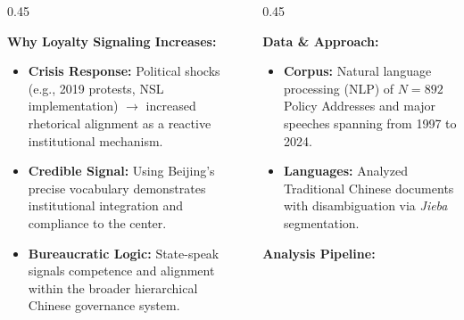 \documentclass[final,table]{beamer} %
\begin{document}
\begin{frame}[t]
\begin{columns}[T]
\begin{column}{0.45\textwidth}
        \vspace{2cm}

        \begin{tcolorbox}[posterbox={5}{Discussion}]
            \textbf{Why Loyalty Signaling Increases:}
            
            \vspace{1cm}
            \begin{itemize}
                \item \textbf{Crisis Response:} Political shocks (e.g., 2019 protests, NSL implementation) $\rightarrow$ increased rhetorical alignment as a reactive institutional mechanism.
                \item \textbf{Credible Signal:} Using Beijing's precise vocabulary demonstrates institutional integration and compliance to the center.
                \item \textbf{Bureaucratic Logic:} State-speak signals competence and alignment within the broader hierarchical Chinese governance system.
            \end{itemize}
        \end{tcolorbox}

    \end{column}

    \begin{column}{0.45\textwidth}

        \begin{tcolorbox}[posterbox={2}{Methods}]
            \textbf{Data \& Approach:}
            \vspace{0.5cm}
            \begin{itemize}
                \item \textbf{Corpus:} Natural language processing (NLP) of $N=892$ Policy Addresses and major speeches spanning from 1997 to 2024.
                \item \textbf{Languages:} Analyzed Traditional Chinese documents with disambiguation via \textit{Jieba} segmentation.
            \end{itemize}
            
            \vspace{1.5cm}
            \textbf{Analysis Pipeline:}
            \vspace{0.8cm}
            
            \begin{center}
\end{center}
\end{tcolorbox}
\end{column}
\end{columns}
\end{frame}
\end{document}
